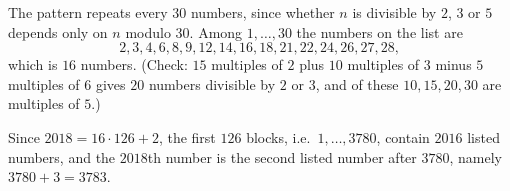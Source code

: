 The pattern repeats every $30$ numbers, since whether $n$ is divisible by $2$, $3$ or $5$ depends only on $n$ modulo $30$. Among $1,\dots,30$ the numbers on the list are
\[
2,3,4,6,8,9,12,14,16,18,21,22,24,26,27,28,
\]
which is $16$ numbers. (Check: $15$ multiples of $2$ plus $10$ multiples of $3$ minus $5$ multiples of $6$ gives $20$ numbers divisible by $2$ or $3$, and of these $10,15,20,30$ are multiples of $5$.)

Since $2018=16\cdot126+2$, the first $126$ blocks, i.e.\ $1,\dots,3780$, contain $2016$ listed numbers, and the $2018$th number is the second listed number after $3780$, namely $3780+3=\boxed{3783}$.
